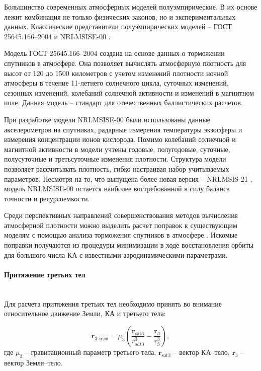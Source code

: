 Большинство современных атмосферных моделей полуэмпирические. 
В их основе лежит комбинация не только
физических законов, но и экспериментальных данных. 
Классические представители полуэмпирических моделей 
-- ГОСТ 25645.166--2004 \cite{gost1662004} и NRLMSISE-00 \cite{picone2002}.

Модель ГОСТ 25645.166--2004 создана на основе данных о торможении спутников в атмосфере.
Она позволяет вычислять атмосферную плотность для высот от 120 до 1500 километров с учетом
изменений плотности ночной атмосферы в течение 11-летнего солнечного цикла, суточных изменений,
сезонных изменений, колебаний солнечной активности и изменений в магнитном поле.
Данная модель -- стандарт для отечественных баллистических расчетов.

При разработке модели NRLMSISE-00 были использованы данные акселерометров на спутниках,
радарные измерения температуры экзосферы и измерения концентрации ионов кислорода.
Помимо колебаний солнечной и магнитной активности в модели
учтены годовые, полугодовые, суточные, полусуточные и третьсуточные изменения плотности.
Структура модели позволяет рассчитывать плотность, гибко настраивая набор учитываемых параметров.
Несмотря на то, что выпущена более новая версия -- NRLMSIS-21 \cite{emmert2021, emmert2022}, 
модель NRLMSISE-00 остается наиболее востребованной в силу баланса точности и ресурсоемкости.

Среди перспективных направлений совершенствования методов вычисления атмосферной плотности 
можно выделить расчет поправок к существующим моделям с помощью анализа торможения спутников
в атмосфере \cite{cefola2003}. Искомые поправки получаются из процедуры минимизации в ходе
восстановления орбиты для большого числа КА с известными
аэродинамическими параметрами.

\paragraph{Притяжение третьих тел} \mbox{} \\

Для расчета притяжения третьих тел необходимо принять во внимание относительное движение
Земли, КА и третьего тела:

\begin{equation*}
    \ddot{\mathbf{r}}_{\text{3-тело}} = \mu_3 \left( \frac{\mathbf{r}_{\text{sat3}}}{r^3_{sat3}}
                                    - \frac{\mathbf{r}_{\text{3}}}{r^3_{3}} \right),
\end{equation*}
где $\mu_3$ -- гравитационный параметр третьего тела,
 $\mathbf{r}_{\text{sat3}}$ -- вектор КА--тело, 
 $\mathbf{r}_{3}$ -- вектор Земля--тело. 

